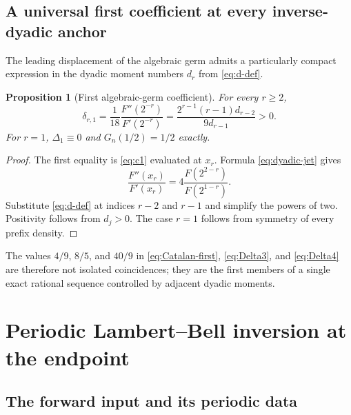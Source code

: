 \documentclass[11pt,oneside]{article}
\numberwithin{equation}{section}
\newtheorem{proposition}[theorem]{Proposition}
\theoremstyle{definition}
\theoremstyle{remark}
\begin{document}
\subsection{A universal first coefficient at every inverse-dyadic anchor}

The leading displacement of the algebraic germ admits a particularly compact expression in
the dyadic moment numbers $d_r$ from \eqref{eq:d-def}.

\begin{proposition}[First algebraic-germ coefficient]
\label{prop:first-dyadic-germ-coefficient}
For every $r\ge2$,
\begin{equation}
 \boxed{
 \delta_{r,1}
 =\frac1{18}\frac{F''(2^{-r})}{F'(2^{-r})}
 =\frac{2^{r-1}(r-1)d_{r-2}}{9d_{r-1}}>0.}
 \label{eq:first-dyadic-germ-coefficient}
\end{equation}
For $r=1$, $\Delta_1\equiv0$ and $G_n(1/2)=1/2$ exactly.
\end{proposition}

\begin{proof}
The first equality is \eqref{eq:c1} evaluated at $x_r$.  Formula
\eqref{eq:dyadic-jet} gives
\[
 \frac{F''(x_r)}{F'(x_r)}
 =4\frac{F(2^{2-r})}{F(2^{1-r})}.
\]
Substitute \eqref{eq:d-def} at indices $r-2$ and $r-1$ and simplify the powers
of two.  Positivity follows from $d_j>0$.  The case $r=1$ follows from symmetry
of every prefix density.
\end{proof}

The values $4/9$, $8/5$, and $40/9$ in
\eqref{eq:Catalan-first}, \eqref{eq:Delta3}, and \eqref{eq:Delta4} are therefore
not isolated coincidences; they are the first members of a single exact rational
sequence controlled by adjacent dyadic moments.

\section{Periodic Lambert--Bell inversion at the endpoint}
\label{sec:endpoint-inversion}

\subsection{The forward input and its periodic data}
\end{document}
